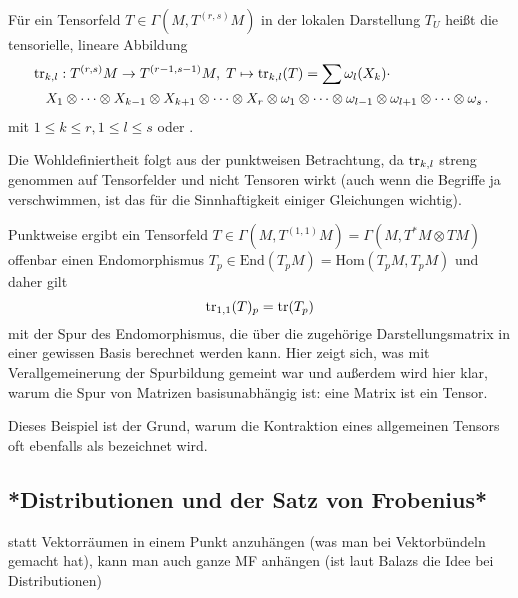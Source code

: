 \documentclass[../H_Analysis_main.tex]{subfiles}
\begin{document}
\begin{defi}
Für ein Tensorfeld $T \in \Gamma(M, T^{(r, s)}M)$ in der lokalen Darstellung $T_U$ heißt die tensorielle, lineare Abbildung
\begin{align}
&\tr_{k, l}: T^{(r, s)}M \rightarrow T^{(r - 1, s - 1)}M, \; T \mapsto \tr_{k, l}(T) = \sum \omega_l(X_k) \cdot
\\
& \quad X_1 \otimes \dots \otimes X_{k -1 } \otimes X_{k + 1} \otimes \dots \otimes X_r \otimes \omega_1 \otimes \dots \otimes \omega_{l - 1} \otimes \omega_{l + 1} \otimes \dots \otimes \omega_s \, .\notag
\end{align}
mit $1 \leq k \leq r, 1 \leq l \leq s$  oder .
\end{defi}
Die Wohldefiniertheit folgt aus der punktweisen Betrachtung, da $\tr_{k, l}$ streng genommen auf Tensorfelder und nicht Tensoren wirkt (auch wenn die Begriffe ja verschwimmen, ist das für die Sinnhaftigkeit einiger Gleichungen wichtig).


\begin{bsp}[Spur]
Punktweise ergibt ein Tensorfeld $T \in \Gamma(M, T^{(1, 1)}M) = \Gamma(M, T^*M \otimes TM)$ offenbar einen Endomorphismus $T_p \in \text{End}(T_p M) = \text{Hom}(T_p M, T_p M)$ und daher gilt
\begin{equation}
\tr_{1, 1}(T)_p = \tr(T_p)
\end{equation}
mit der Spur des Endomorphismus, die über die zugehörige Darstellungsmatrix in einer gewissen Basis berechnet werden kann. Hier zeigt sich, was mit Verallgemeinerung der Spurbildung gemeint war und außerdem wird hier klar, warum die Spur von Matrizen basisunabhängig ist: eine Matrix ist ein Tensor.
\end{bsp}
Dieses Beispiel ist der Grund, warum die Kontraktion eines allgemeinen Tensors oft ebenfalls als  bezeichnet wird.



		\subsection{*Distributionen und der Satz von Frobenius*}
statt Vektorräumen in einem Punkt anzuhängen (was man bei Vektorbündeln gemacht hat), kann man auch ganze MF anhängen (ist laut Balazs die Idee bei Distributionen)
\end{document}
